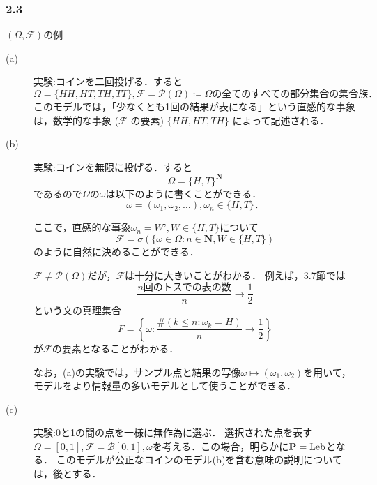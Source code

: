 \documentclass{jsarticle}
\begin{document}
\subsubsection*{2.3}
$(\Omega,\mathcal{F})$の例
\begin{description}
    \item[(a)] 実験:コインを二回投げる．すると
        \begin{equation}
            \Omega=\{HH,HT,TH,TT\} , \mathcal{F}=\mathcal{P}(\Omega)\coloneqq \Omega の全てのすべての部分集合の集合族． \nonumber
        \end{equation}
        このモデルでは，「少なくとも1回の結果が表になる」という直感的な事象は，数学的な事象 ($\mathcal{F}$ の要素) $\{HH,HT,TH\}$ によって記述される．
    \item[(b)] 実験:コインを無限に投げる．すると
        \begin{equation}
            \Omega=\{H,T\}^{\mathbf{N}} \nonumber
        \end{equation}
        であるので$\Omega$の$\omega$は以下のように書くことができる．
        \begin{equation}
            \omega = (\omega_1,\omega_2,\dots) , \omega_n \in \{H,T\}． \nonumber
        \end{equation}

        ここで，直感的な事象$\omega_n=W’,W\in\{H,T\}$について
        \begin{equation}
            \mathcal{F} = \sigma(\{\omega\in\Omega \colon n\in\mathbf{N},W\in\{H,T\}) \nonumber
        \end{equation}
        のように自然に決めることができる．

        $\mathcal{F}\neq\mathcal{P}(\Omega)$だが，$\mathcal{F}$は十分に大きいことがわかる．
        例えば，3.7節では
        \begin{equation}
            \frac{ n回のトスでの表の数 }{n} \to \frac{1}{2}
        \end{equation}
        という文の真理集合
        \begin{equation}
            F=\left\{ \omega\colon \frac{\#(k\leq n\colon\omega_k=H)}{n} \to \frac{1}{2} \right\} \nonumber
        \end{equation}
        が$\mathcal{F}$の要素となることがわかる．

        なお，(a)の実験では，サンプル点と結果の写像$\omega\mapsto(\omega_1,\omega_2)$を用いて，モデルをより情報量の多いモデルとして使うことができる．

        \item[(c)]実験:0と1の間の点を一様に無作為に選ぶ．
        選択された点を表す$\Omega=[0,1],\mathcal{F}=\mathcal{B}[0,1],\omega$を考える．この場合，明らかに$\mathbf{P}={\rm Leb}$となる．
        このモデルが公正なコインのモデル(b)を含む意味の説明については，後とする．
\end{description}
\end{document}
